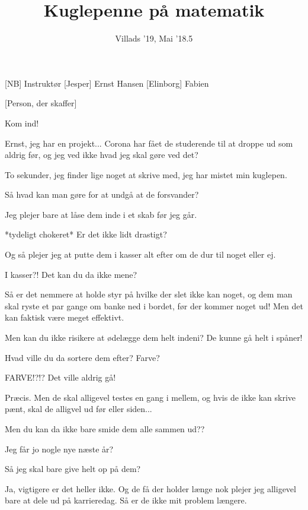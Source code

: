\documentclass[a4paper,11pt]{article}
\title{Kuglepenne på matematik}
\author{Villads '19, Mai '18.5}
\begin{document}
\maketitle

\begin{roles}
[NB] Instruktør
[Jesper] Ernst Hansen
[Elinborg] Fabien
\end{roles}

\begin{props}
[Person, der skaffer]
\end{props}


\begin{sketch}

 Kom ind!

 Ernst, jeg har en projekt... Corona har fået de studerende til at droppe ud som aldrig før, og jeg ved ikke hvad jeg skal gøre ved det?

 To sekunder, jeg finder lige noget at skrive med, jeg har mistet min kuglepen.


 Så hvad kan man gøre for at undgå at de forsvander?

 Jeg plejer bare at låse dem inde i et skab før jeg går.

 *tydeligt chokeret* Er det ikke lidt drastigt?

 Og så plejer jeg at putte dem i kasser alt efter om de dur til noget eller ej.

 I kasser?! Det kan du da ikke mene?

 Så er det nemmere at holde styr på hvilke der slet ikke kan noget, og dem man skal ryste et par gange om banke ned i bordet, før der kommer noget ud! Men det kan faktisk være meget effektivt.

 Men kan du ikke risikere at ødelægge dem helt indeni? De kunne gå helt i spåner!

 Hvad ville du da sortere dem efter? Farve?

 FARVE!?!? Det ville aldrig gå!

 Præcis. Men de skal alligevel testes en gang i mellem, og hvis de ikke kan skrive pænt, skal de alligvel ud før eller siden...

 Men du kan da ikke bare smide dem alle sammen ud??

 Jeg får jo nogle nye næste år?

 Så jeg skal bare give helt op på dem?

 Ja, vigtigere er det heller ikke. Og de få der holder længe nok plejer jeg alligevel bare at dele ud på karrieredag. Så er de ikke mit problem længere.

\end{sketch}
\end{document}
